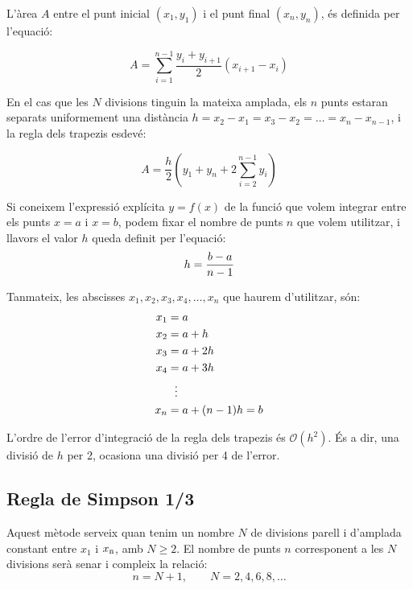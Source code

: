 L'àrea $A$ entre el punt inicial $(x_1, y_1)$ i el punt final $(x_n, y_n)$, és definida per l'equació:

 \begin{equation}\label{eq:trap-uneven}
    A = \sum_{i=1}^{n-1} \frac{y_i + y_{i+1}}{2} (x_{i+1}-x_i)
 \end{equation}

En el cas que les $N$ divisions tinguin la mateixa amplada, els  $n$ punts estaran separats uniformement una distància $h = x_2-x_1 = x_3-x_2 = \dots = x_n-x_{n-1}$, i la regla dels trapezis esdevé:

 \begin{equation}\label{eq:trap}
    A = \frac{h}{2} \left( y_1 + y_n + 2 \sum_{i=2}^{n-1} y_i \right)
 \end{equation}

Si coneixem l'expressió explícita $y=f(x)$ de la funció que volem integrar entre els punts $x=a$ i $x=b$, podem fixar el nombre de punts $n$ que volem utilitzar, i llavors el valor $h$ queda definit per l'equació:
\begin{equation}\label{eq:trap_1}
    h = \frac{b-a}{n-1}\\
\end{equation}

Tanmateix, les abscisses $x_1, x_2, x_3,x_4, \dotsc , x_n$ que haurem d'utilitzar, són:
\begin{align}\label{eq:trap_2}
    x_1 &= a \notag\\
    x_2 &= a + h \notag\\
    x_3 &= a + 2 h \notag\\
    x_4 &= a + 3 h\\
    {} &\hspace{1.5ex}\vdots {} \notag\\
    x_n &= a + (n-1)h =b \notag
\end{align}

L'ordre de l'error d'integració de la regla dels trapezis és $\mathscr{O}(h^2)$. És a dir, una divisió de $h$ per 2, ocasiona una divisió per 4 de l'error.

\subsection{Regla de Simpson 1/3}

Aquest mètode serveix quan tenim un nombre  $N$ de divisions parell i d'amplada constant entre $x_1$ i $x_\mathrm{n}$, amb $N \geq 2$.  El nombre de punts $n$ corresponent a les  $N$ divisions serà senar i compleix la relació: 
\begin{equation}
	n = N+1, \qquad N = 2, 4, 6, 8, \dots
\end{equation}

